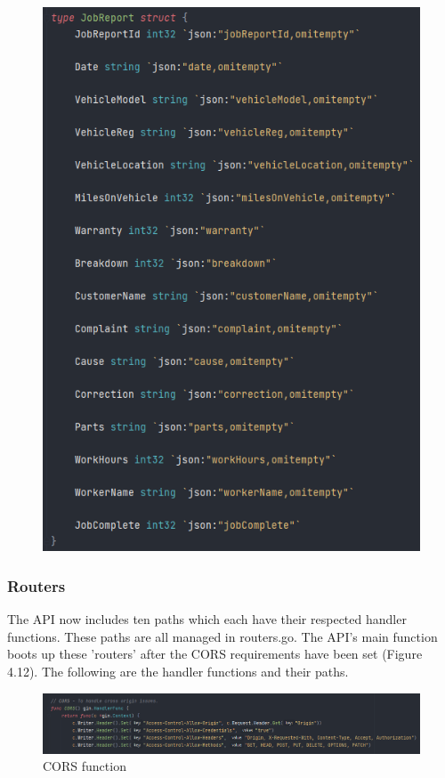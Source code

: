 \begin{figure}[H]
\begin{minipage}[b]{0.45\linewidth}
    \includegraphics[width=1.0\textwidth]{images/horton/models/report_struct.png}
\end{minipage}
\end{figure}

\subsubsection{Routers}
The API now includes ten paths which each have their respected handler functions.
These paths are all managed in routers.go. The API's main function boots up these 'routers' after the CORS requirements have been set (Figure 4.12). The following are the handler functions and their paths.  

\begin{figure}[H]
    \caption{CORS function}
    \label{image:cors-req}
    \centering
    \includegraphics[width=1.0\textwidth]{images/horton/cors.png}
\end{figure}

